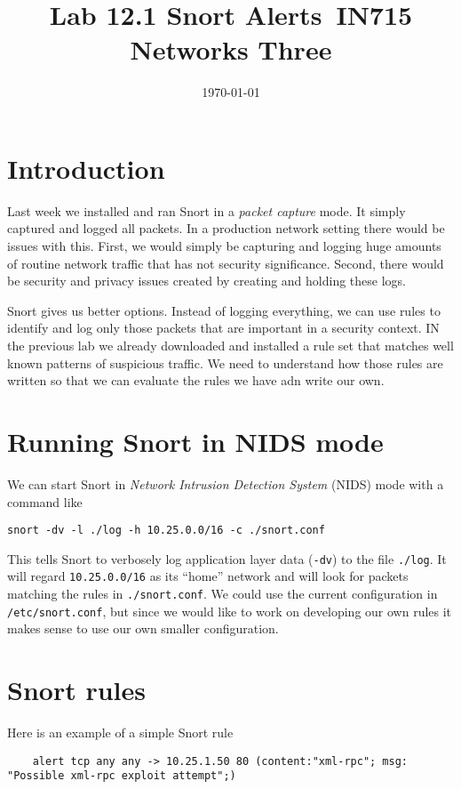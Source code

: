 \documentclass{article}
\begin{document}
\title{ Lab 12.1 Snort Alerts\ IN715 Networks Three}
\date{\today}
\maketitle

\section*{Introduction}
Last week we installed and ran Snort in a \emph{packet capture} mode.  It simply captured and logged all packets. In a production network setting there would be issues with this.  First, we would simply be capturing and logging huge amounts of routine network traffic that has not security significance.  Second, there would be security and privacy issues created by creating and holding these logs.

Snort gives us better options. Instead of logging everything, we can use rules to identify and log only those packets that are important in a security context.  IN the previous lab we already downloaded and installed a rule set that matches well known patterns of suspicious traffic.  We need to understand how those rules are written so that we can evaluate the rules we have adn write our own.

\section{Running Snort in NIDS mode}
We can start Snort in \emph{Network Intrusion Detection System} (NIDS) mode with a command like

\texttt{snort -dv -l ./log -h 10.25.0.0/16 -c ./snort.conf}

This tells Snort to verbosely log application layer data (\texttt{-dv}) to the file \texttt{./log}.  It will regard \texttt{10.25.0.0/16} as its ``home'' network and will look for packets matching the rules in \texttt{./snort.conf}. We could use the current configuration in \texttt{/etc/snort.conf}, but since we would like to work on developing our own rules it makes sense to use our own smaller configuration.

\section{Snort rules}
Here is an example of a simple Snort rule

\begin{verbatim}
    alert tcp any any -> 10.25.1.50 80 (content:"xml-rpc"; msg: "Possible xml-rpc exploit attempt";)
\end{verbatim}
\end{document}
